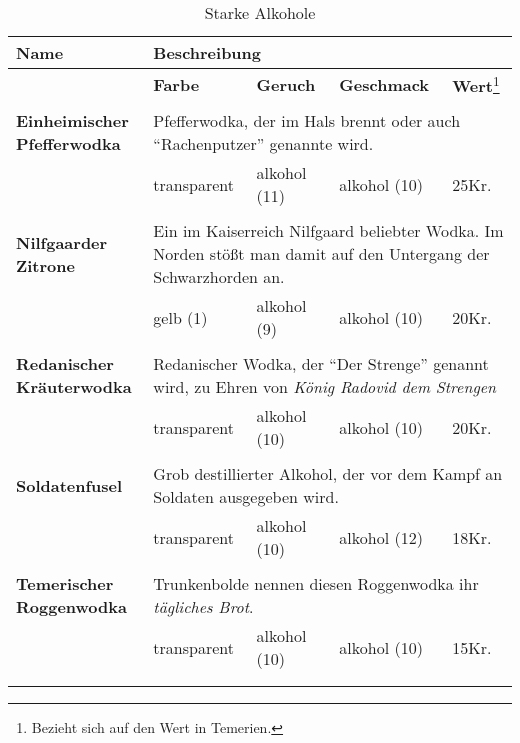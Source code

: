 \begin{longtable}{|p{6cm}|p{}|p{}|p{}|p{1cm}|}
\hline
\textbf{Name} & \multicolumn{4}{p{10cm}|}{\textbf{Beschreibung}} \\ \hline
\multicolumn{1}{r|}{} & \textbf{Farbe} & \textbf{Geruch} & \textbf{Geschmack} & \textbf{Wert}\footnote{Bezieht sich auf den Wert in Temerien.} \\ \cline{2-5}
\multicolumn{5}{c}{} \\ \hline

\textbf{Einheimischer Pfefferwodka} & \multicolumn{4}{p{10cm}|}{Pfefferwodka, der im Hals brennt oder auch "`Rachenputzer"' genannte wird.} \\ \hline
\multicolumn{1}{r|}{} & transparent & alkohol (11) & alkohol (10) & 25Kr. \\ \cline{2-5}

\multicolumn{5}{c}{} \\ \hline

\textbf{Nilfgaarder Zitrone} & \multicolumn{4}{p{10cm}|}{Ein im Kaiserreich Nilfgaard beliebter Wodka. Im Norden stößt man damit auf den Untergang der Schwarzhorden an.} \\ \hline
\multicolumn{1}{r|}{} & gelb (1) & alkohol (9) & alkohol (10) & 20Kr. \\ \cline{2-5}

\multicolumn{5}{c}{} \\ \hline

\textbf{Redanischer Kräuterwodka} & \multicolumn{4}{p{10cm}|}{Redanischer Wodka, der "`Der Strenge"' genannt wird, zu Ehren von \textit{König Radovid dem Strengen}} \\ \hline
\multicolumn{1}{r|}{} & transparent & alkohol (10) & alkohol (10) & 20Kr. \\ \cline{2-5}

\multicolumn{5}{c}{} \\ \hline

\textbf{Soldatenfusel} & \multicolumn{4}{p{10cm}|}{Grob destillierter Alkohol, der vor dem Kampf an Soldaten ausgegeben wird.} \\ \hline
\multicolumn{1}{r|}{} & transparent & alkohol (10) & alkohol (12) & 18Kr. \\ \cline{2-5}

\multicolumn{5}{c}{} \\ \hline

\textbf{Temerischer Roggenwodka} & \multicolumn{4}{p{10cm}|}{Trunkenbolde nennen diesen Roggenwodka ihr \textit{tägliches Brot}. } \\ \hline
\multicolumn{1}{r|}{} & transparent & alkohol (10) & alkohol (10) & 15Kr. \\ \cline{2-5}

\multicolumn{5}{c}{} \\ 

\caption{Starke Alkohole}
\label{tab:starke_alkohole}
\end{longtable}


